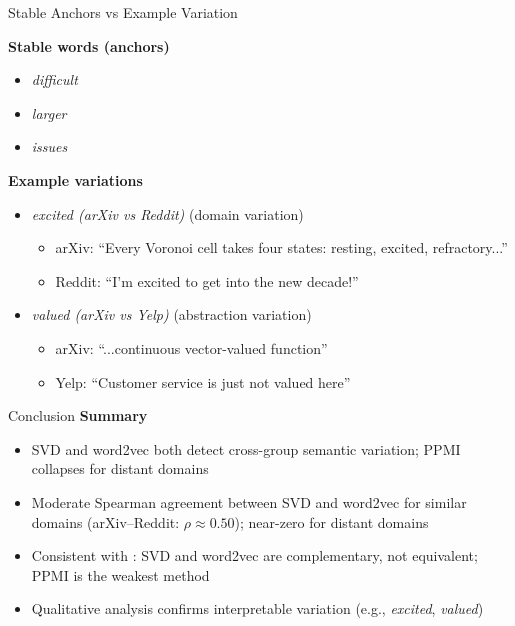 \documentclass[aspectratio=169]{beamer}
\begin{document}
\begin{frame}{Stable Anchors vs Example Variation}

\textbf{Stable words (anchors)}
\begin{itemize}
    \item \textit{difficult}
    \item \textit{larger}
    \item \textit{issues}
\end{itemize}

\vspace{0.5em}

\textbf{Example variations}
\begin{itemize}

    \item \textit{excited  (arXiv vs Reddit)} \hfill \small (domain variation)
    \begin{itemize}
        \item arXiv: ``Every Voronoi cell takes four states: resting, excited, refractory...''
        \item Reddit: ``I'm excited to get into the new decade!''
    \end{itemize}

    \item \textit{valued  (arXiv vs Yelp)} \hfill \small (abstraction variation)
    \begin{itemize}
        \item arXiv: ``...continuous vector-valued function''
        \item Yelp: ``Customer service is just not valued here''
    \end{itemize}

\end{itemize}

\end{frame}

\begin{frame}{Conclusion}
    \textbf{Summary}
    \begin{itemize}
        \item SVD and word2vec both detect cross-group semantic variation; PPMI collapses for distant domains
        \item Moderate Spearman agreement between SVD and word2vec for similar domains (arXiv--Reddit: \( \rho \approx 0.50 \)); near-zero for distant domains
        \item Consistent with \citet{hamilton2016diachronic}: SVD and word2vec are complementary, not equivalent; PPMI is the weakest method
        \item Qualitative analysis confirms interpretable variation (e.g., \textit{excited}, \textit{valued})
    \end{itemize}
\end{frame}
\end{document}
